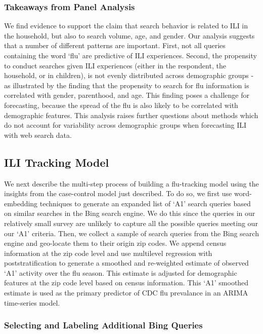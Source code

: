 \documentclass[12pt]{article}
\begin{document}
\subsubsection{Takeaways from Panel Analysis}

We find evidence to support the claim that search behavior is related to ILI in the household, but also to search volume, age, and gender. Our analysis suggests that a number of different patterns are important. First, not all queries containing the word `flu' are predictive of ILI experiences. Second, the propensity to conduct searches given ILI experiences (either in the respondent, the household, or in children), is not evenly distributed across demographic groups - as illustrated by the finding that the propensity to search for flu information is correlated with gender, parenthood, and age. This finding poses a challenge for forecasting, because the spread of the flu is also likely to be correlated with demographic features. This analysis raises further questions about methods which do not account for variability across demographic groups when forecasting ILI with web search data. 

\subsection{ILI Tracking Model}

We next describe the multi-step process of building a flu-tracking model using the insights from the case-control model just described. To do so, we first use word-embedding techniques to generate an expanded list of `A1' search queries based on similar searches in the Bing search engine. We do this since the queries in our relatively small survey are unlikely to capture all the possible queries meeting our our `A1' criteria. Then, we collect a sample of search queries from the Bing search engine and geo-locate them to their origin zip codes. We append census information at the zip code level and use multilevel regression with poststratification to generate a smoothed and re-weighted estimate of observed `A1' activity over the flu season. This estimate is adjusted for demographic features at the zip code level based on census information. This `A1' smoothed estimate is used as the primary predictor of CDC flu prevalance in an ARIMA time-series model. 

\subsubsection{Selecting and Labeling Additional Bing Queries}
\end{document}
